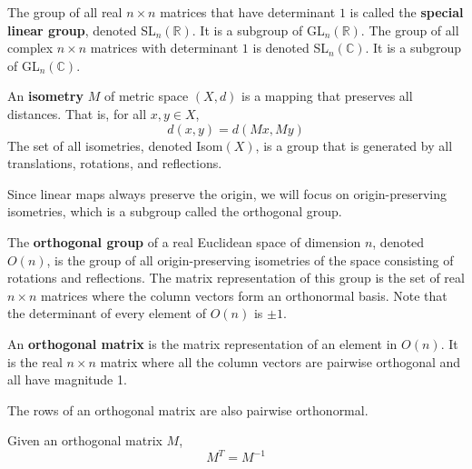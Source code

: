   \begin{definition}
    The group of all real $n \times n$ matrices that have determinant $1$ is called the \textbf{special linear group}, denoted SL$_n (\mathbb{R})$. It is a subgroup of GL$_n (\mathbb{R})$. The group of all complex $n \times n$ matrices with determinant $1$ is denoted SL$_n (\mathbb{C})$. It is a subgroup of GL$_n(\mathbb{C})$. 
  \end{definition}

  \begin{definition}[Isometry]
    An \textbf{isometry} $M$ of metric space $(X, d)$ is a mapping that preserves all distances. That is, for all $x, y \in X$, 
    \begin{equation}
      d(x, y) = d(M x, M y) 
    \end{equation}
    The set of all isometries, denoted Isom$(X)$, is a group that is generated by all translations, rotations, and reflections. 
  \end{definition}

  Since linear maps always preserve the origin, we will focus on origin-preserving isometries, which is a subgroup called the orthogonal group.

  \begin{definition}
    The \textbf{orthogonal group} of a real Euclidean space of dimension $n$, denoted $O(n)$, is the group of all origin-preserving isometries of the space consisting of rotations and reflections. The matrix representation of this group is the set of real $n \times n$ matrices where the column vectors form an orthonormal basis. Note that the determinant of every element of $O(n)$ is $\pm 1$. 
  \end{definition}

  \begin{definition}
    An \textbf{orthogonal matrix} is the matrix representation of an element in $O(n)$. It is the real $n \times n$ matrix where all the column vectors are pairwise orthogonal and all have magnitude 1. 
  \end{definition}

  \begin{proposition}
    The rows of an orthogonal matrix are also pairwise orthonormal.
  \end{proposition}

  \begin{proposition}
    Given an orthogonal matrix $M$,
    \begin{equation}
      M^T = M^{-1}
    \end{equation}
  \end{proposition}

